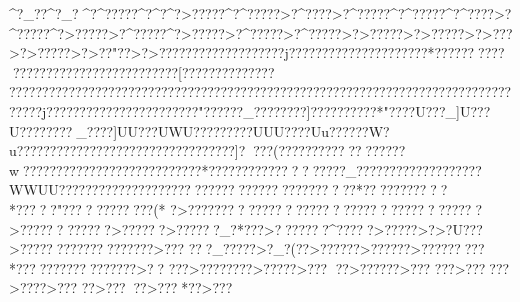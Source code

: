 {{{{{{{{{{{{{{{{{{{{{{{{{{{{{{{{{{{{{{{{{{{{{{{{{{{{{{{{{{{{{{{{{{{{{{{{{{{{{{{{{{{{{{{{{{{{{{{{{{{{{{{{{{{{{{{{{{{{{{{{{{{{{{{{{{{{{{{{{{{{{{{{{{{{{{{{{{{{{{{{{{{{{{{{{{{{{{{{{{{{{{{{{{{{{{{{{{{{{{{{{{{{{{{{{{{{{{{{{{{{{{{{{{{{{{{{{{{{{{{{{{{{{{{{{{{{{{{{{{{{{{{{{{{{{{{{{{{{{{{{{{{{{{{{{{{{{{{{{{{{{{{{{{{{{{{{{{{{{{{{{{{{{{{{{{{{{{{{{{{{{{{{{{{{{{{{{{{{{{{{{{{{{{{{{{{{{{{{{{{{{{{{{{{{{{{{{{{{{{{{{{{{{{{{{{{{{{{{{{{{{{{{{{{{{{{{{{{{{{{{{{{{{{{{{{{{{{{{{{{{{{{{{{{{{{{{{{{{{{{{{{{{{{{{{{{{{{{{{{{{{{{{{{{{{{{{{{{{{{{{{{{{{{{{{{{{{{{{{{{{{{{{{{{{{{{{{{{{{{{{{{{{{{{{{{{{{{{{{{{{{{{{{{{{{{{{{{{{{{{{{{{{{{{{{{{{{{{{{{{{{{{{{{{{{{{{{{{{{{{{{{{{{{{{{{{{{{{{{{{{{{{{{{{{{{{{{{{{{{{{{{{{{{{{{{{{{{{{{{{{{{{{{{{{{{{{{{{{{{{{{{{{{{{{{{{{{{{{{{{{{{{{{{{{{{{{{{{{{{{{{{{{{{{{{{{{{{{{{{{{{{{{{{{{{{{{{{{{{{{{{{{{{{{{{{{{{{{{{{{{{{{{{{{{{{{{{{{{{{{{{{{{{{{{{{{{{{{{{{{{{{{{{{{{{{{{{{{{{{{{{{{{{{{{{{{{{{{{{{{{{{{{{{{{{{{{{{{{{{{{{{{{{{{{{{{{{{{{{{{{{{{{{{{{{{{{{{{{{{{{{{{{{{{{{{{{{{{{{{{{{{{{{{{{{{{{{{{{{{{{{{{{{{{{{{{{{{{{{{{{{{{{{{{{{{{{{{{{{{{{{{{{{{{{{{{{{{{{{{{{{{{{{{{{{{{{{{{{{{{{{{{{{{{{{{{{{{{{{{{{{{{{{{{{{{{{{{{{{{{{{{{{{{{{{{{{{{{{{{{{{{{{{{{{{{{{{{{{{{{{{{{{{{{{{{{{{{{{{{{{{{{{{{{{{{{{{{{{{{{{{{{{{{{{{{{{{{{{{{{{{{{{{{{{{{{{{{{{{{{{{{{{{{{{{{{{{{{{{{{{{{{{{{{{{{{{{{{{{{{{{{{{{{{{{{{{{{{{{{{{{{{{{{{{{{{{{{{{{{{{{{{{{{{{{{{{{{{{{{{{{{{{{{{{{{{{{{{{{{{{{{{{{{{{{{{{{{{{{{{{{{{{{{{{{{{{{{{{{{{{{{{{{{{{{{{{{{{{{{{{{{{{{{{{{{{{{{{{{{{{{{{{{{{{{{{{{{{{{{{{{{{{{{{{{{{{{{{{{{{{{{{{{{{{{{{{{{{{{{{{{{{{{{{{{{{{{{{{{{{{{{{{{{{{{{{{{{{{{{{{{{{{{{{{{{{{{{{{{{{{{{{{{{{{{{{{{{{{{{{{{{{{{{{{{{{{{{{{{{{{{{{{{{{{{{{{{{{{{{{{{{{{{{{{{{{{{{{{{{{{{{{{{{{{{{{{{{{{{{{{{{{{{{{{{{{{{{{{{{{{{{{{{{{{{{{{{{{{{{{{{{{{{{{{{{{{{{{{{{{{{{{{{{{{{{{{{{{{{{{{{{{{{{{{{{{{{{{{{{{{{{{{{{{{{{{{{{{{{{{{{{{{{{{{{{{{{{{{{{{{{{{{{{{{{{{{{{{{{{{{{{{{{{{{{{{{{{{{{{{{{{{{{{{{{{{{{{{{{{{{{{{{{{{{{{{{{{{{{{^?_?   ?^?_?   ^?^?????^?^?    ^?>?????^?^?????>?^????}>?^?????^?^?????^?^????>?^?????^?>?????>?^?????^?>?????>?^?????>?^?????>?>?????>?>?????>?>???>?>?????>?>??"??>?>???????????????????j?????????????????????*??????????
 ???????????}??????????????[??????????????
  ????????????? ????????????????????????????????????????????????????????????????????j???????????????????????"??????_????????]??????????*" ???}?U???_]U???U????????_????]UU???UWU?????????UUU????Uu??????W?u?????????????????????????????????]????(??????????????????w???????????????????????????*???????????????????_???????????????????WWUU????????????    ??????????????????????????????*???????????*?????"????????????(* ?>??????????????????????????????????????>????????????>??????>??????_?*???>???????^?????>?????>?>?U???>???  ????????????????>???  ???_?????>?_? (??>??? ???>??? ???>??? ??????*?????????????????>??
???>??? ?????>?????>???
??>??? ???>???
???>??????>???   ?>???  ??>?????>???*??>??? }}}}}}}}}}}}}}}}}}}}}}}}}}}}}}}}}}}}}}}}}}}}}}}}}}}}}}}}}}}}}}}}}}}}}}}}}}}}}}}}}}}}}}}}}}}}}}}}}}}}}}}}}}}}}}}}}}}}}}}}}}}}}}}}}}}}}}}}}}}}}}}}}}}}}}}}}}}}}}}}}}}}}}}}}}}}}}}}}}}}}}}}}}}}}}}}}}}}}}}}}}}}}}}}}}}}}}}}}}}}}}}}}}}}}}}}}}}}}}}}}}}}}}}}}}}}}}}}}}}}}}}}}}}}}}}}}}}}}}}}}}}}}}}}}}}}}}}}}}}}}}}}}}}}}}}}}}}}}}}}}}}}}}}}}}}}}}}}}}}}}}}}}}}}}}}}}}}}}}}}}}}}}}}}}}}}}}}}}}}}}}}}}}}}}}}}}}}}}}}}}}}}}}}}}}}}}}}}}}}}}}}}}}}}}}}}}}}}}}}}}}}}}}}}}}}}}}}}}}}}}}}}}}}}}}}}}}}}}}}}}}}}}}}}}}}}}}}}}}}}}}}}}}}}}}}}}}}}}}}}}}}}}}}}}}}}}}}}}}}}}}}}}}}}}}}}}}}}}}}}}}}}}}}}}}}}}}}}}}}}}}}}}}}}}}}}}}}}}}}}}}}}}}}}}}}}}}}}}}}}}}}}}}}}}}}}}}}}}}}}}}}}}}}}}}}}}}}}}}}}}}}}}}}}}}}}}}}}}}}}}}}}}}}}}}}}}}}}}}}}}}}}}}}}}}}}}}}}}}}}}}}}}}}}}}}}}}}}}}}}}}}}}}}}}}}}}}}}}}}}}}}}}}}}}}}}}}}}}}}}}}}}}}}}}}}}}}}}}}}}}}}}}}}}}}}}}}}}}}}}}}}}}}}}}}}}}}}}}}}}}}}}}}}}}}}}}}}}}}}}}}}}}}}}}}}}}}}}}}}}}}}}}}}}}}}}}}}}}}}}}}}}}}}}}}}}}}}}}}}}}}}}}}}}}}}}}}}}}}}}}}}}}}}}}}}}}}}}}}}}}}}}}}}}}}}}}}}}}}}}}}}}}}}}}}}}}}}}}}}}}}}}}}}}}}}}}}}}}}}}}}}}}}}}}}}}}}}}}}}}}}}}}}}}}}}}}}}}}}}}}}}}}}}}}}}}}}}}}}}}}}}}}}}}}}}}}}}}}}}}}}}}}}}}}}}}}}}}}}}}}}}}}}}}}}}}}}}}}}}}}}}}}}}}}}}}}}}}}}}}}}}}}}}}}}}}}}}}}}}}}}}}}}}}}}}}}}}}}}}}}}}}}}}}}}}}}}}}}}}}}}}}}}}}}}}}}}}}}}}}}}}}}}}}}}}}}}}}}}}}}}}}}}}}}}}}}}}}}}}}}}}}}}}}}}}}}}}}}}}}}}}}}}}}}}}}}}}}}}}}}}}}}}}}}}}}}}}}}}}}}}}}}}}}}}}}}}}}}}}}}}}}}}}}}}}}}}}}}}}}}}}}}}}}}}}}}}}}}}}}}}}}}}}}}}}}}}}}}}}}}}}}}}}}}}}}}}}}}}}}}}}}}}}}}}}}}}}}}}}}}}}}}}}}}}}}}}}}}}}}}}}}}}}}}}}}}}}}}}}}}}}}}}}}}}}}}}}}}}}}}}}}}}}}}}}}}}}}}}}}}}}}}}}}}}}}}}}}}}}}}}}}}}}}}}}}}}}}}}}}}}}}}}}}}}}}}}}}}}}}}}}}}}}}}}}}}}}}}}}}}}}}}}}}}}}}}}}}}}}}}}}}}}}}}}}}}}}}}}}}}}}}}}}}}}}}}}}}}}}}}}}}}}}}}}}}}}}}}}}}}}}}}}}}}}}}}}}}}}}}}}}}}}}}}}}}}}}}}}}}}}}}}}}}}}}}}}}}}}}}}}}}}}}}}}}}}}}}}}}}}}}}}}}}}}}}}}}}}}}}}}}}}}}}}}}}}}}}}}}}}}}}}}}}}}}}}}}}}}}}}}}}}}}}}}}}}}}}}}}}}}}}}}}}}}}}}}}
